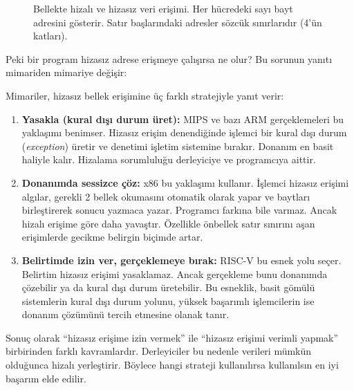 \begin{figure}[H]
\caption[Bellekte hizalı ve hizasız veri erişimi]{Bellekte hizalı ve hizasız veri erişimi. Her hücredeki sayı bayt adresini gösterir. Satır başlarındaki adresler sözcük sınırlarıdır (4'ün katları).}
\label{fig:bellek-hizali}
\end{figure}

Peki bir program hizasız adrese erişmeye çalışırsa ne olur? Bu sorunun yanıtı mimariden mimariye değişir:

\begin{karsilastirma}
Mimariler, hizasız bellek erişimine üç farklı stratejiyle yanıt verir:

\begin{enumerate}[nosep]
\item \textbf{Yasakla (kural dışı durum üret):} MIPS ve bazı ARM gerçeklemeleri bu yaklaşımı benimser. Hizasız erişim denendiğinde işlemci bir kural dışı durum (\emph{exception}) üretir ve denetimi işletim sistemine bırakır. Donanım en basit haliyle kalır. Hizalama sorumluluğu derleyiciye ve programcıya aittir.

\item \textbf{Donanımda sessizce çöz:} x86 bu yaklaşımı kullanır. İşlemci hizasız erişimi algılar, gerekli 2 bellek okumasını otomatik olarak yapar ve baytları birleştirerek sonucu yazmaca yazar. Programcı farkına bile varmaz. Ancak hizalı erişime göre daha yavaştır. Özellikle önbellek satır sınırını aşan erişimlerde gecikme belirgin biçimde artar.

\item \textbf{Belirtimde izin ver, gerçeklemeye bırak:} RISC-V bu esnek yolu seçer. Belirtim hizasız erişimi yasaklamaz. Ancak gerçekleme bunu donanımda çözebilir ya da kural dışı durum üretebilir. Bu esneklik, basit gömülü sistemlerin kural dışı durum yolunu, yüksek başarımlı işlemcilerin ise donanım çözümünü tercih etmesine olanak tanır.
\end{enumerate}

Sonuç olarak ``hizasız erişime izin vermek'' ile ``hizasız erişimi verimli yapmak'' birbirinden farklı kavramlardır. Derleyiciler bu nedenle verileri mümkün olduğunca hizalı yerleştirir. Böylece hangi strateji kullanılırsa kullanılsın en iyi başarım elde edilir.
\end{karsilastirma}

